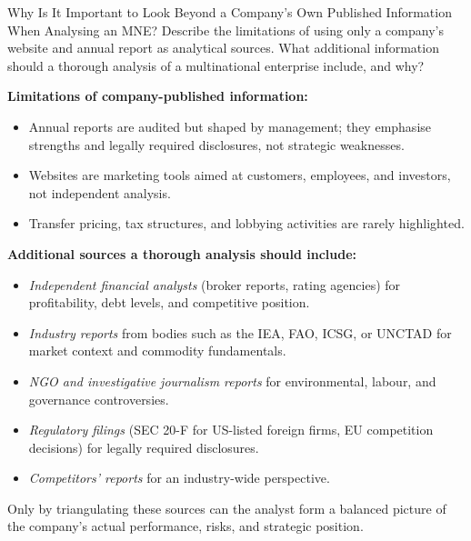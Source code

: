 \documentclass[paper=a5]{scrartcl}
\begin{document}
\begin{question}[type=open]{Why Is It Important to Look Beyond a Company's Own
  Published Information When Analysing an MNE?}
Describe the limitations of using only a company's website and annual report
as analytical sources. What additional information should a thorough analysis
of a multinational enterprise include, and why?

\answerlines[7]

\begin{solution}
  \textbf{Limitations of company-published information:}
  \begin{itemize}
    \item Annual reports are audited but shaped by management; they
      emphasise strengths and legally required disclosures, not strategic
      weaknesses.
    \item Websites are marketing tools aimed at customers, employees, and
      investors, not independent analysis.
    \item Transfer pricing, tax structures, and lobbying activities are
      rarely highlighted.
  \end{itemize}

  \textbf{Additional sources a thorough analysis should include:}
  \begin{itemize}
    \item \emph{Independent financial analysts} (broker reports, rating
      agencies) for profitability, debt levels, and competitive position.
    \item \emph{Industry reports} from bodies such as the IEA, FAO, ICSG,
      or UNCTAD for market context and commodity fundamentals.
    \item \emph{NGO and investigative journalism reports} for environmental,
      labour, and governance controversies.
    \item \emph{Regulatory filings} (SEC 20-F for US-listed foreign firms,
      EU competition decisions) for legally required disclosures.
    \item \emph{Competitors' reports} for an industry-wide perspective.
  \end{itemize}

  Only by triangulating these sources can the analyst form a balanced
  picture of the company's actual performance, risks, and strategic position.
\end{solution}
\end{question}


\end{document}
